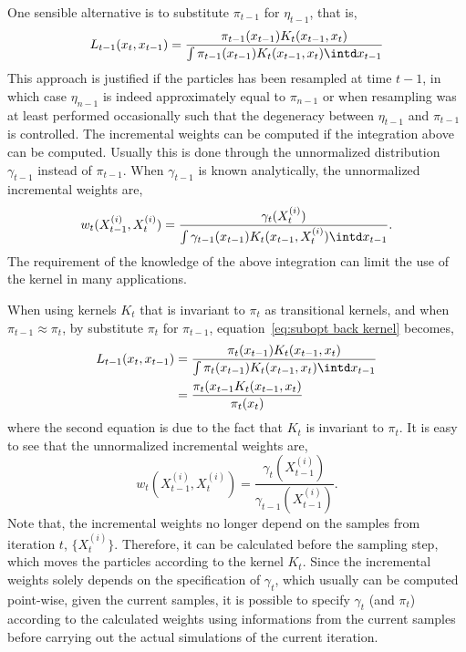 One sensible alternative is to substitute $\pi_{t-1}$ for $\eta_{t-1}$, that
is,
\begin{equation}
  L_{t-1}(x_t,x_{t-1}) =
  \frac{\pi_{t-1}(x_{t-1})K_t(x_{t-1},x_t)}
  {\int \pi_{t-1}(x_{t-1})K_t(x_{t-1},x_t)\intd x_{t-1}}
  \label{eq:subopt back kernel}
\end{equation}
This approach is justified if the particles has been resampled at time $t-1$,
in which case $\eta_{n-1}$ is indeed approximately equal to $\pi_{n-1}$ or
when resampling was at least performed occasionally such that the degeneracy
between $\eta_{t-1}$ and $\pi_{t-1}$ is controlled. The incremental weights
can be computed if the integration above can be computed.  Usually this is
done through the unnormalized distribution $\gamma_{t-1}$ instead of
$\pi_{t-1}$. When $\gamma_{t-1}$ is known analytically, the unnormalized
incremental weights are,
\begin{equation}
  w_t(X_{t-1}^{(i)},X_t^{(i)}) =
  \frac{\gamma_t(X_t^{(i)})}
  {\int\gamma_{t-1}(x_{t-1})K_t(x_{t-1},X_t^{(i)})\intd x_{t-1}}.
  \label{eq:inc weight subopt}
\end{equation}
The requirement of the knowledge of the above integration can limit the use of
the kernel in many applications.

When using \mcmc kernels $K_t$ that is invariant to $\pi_t$ as transitional
kernels, and when $\pi_{t-1}\approx\pi_t$, by substitute $\pi_t$ for
$\pi_{t-1}$, equation~\eqref{eq:subopt back kernel} becomes,
\begin{align}
  L_{t-1}(x_t,x_{t-1})
  &= \frac{\pi_t(x_{t-1})K_t(x_{t-1},x_t)}
  {\int \pi_t(x_{t-1})K_t(x_{t-1},x_t)\intd x_{t-1}} \notag\\
  &= \frac{\pi_t(x_{t-1}K_t(x_{t-1},x_t)}{\pi_t(x_t)}
  \label{eq:subopt back kernel mcmc}
\end{align}
where the second equation is due to the fact that $K_t$ is invariant to
$\pi_t$. It is easy to see that the unnormalized incremental weights are,
\begin{equation}
  w_t(X_{t-1}^{(i)},X_t^{(i)}) =
  \frac{\gamma_t(X_{t-1}^{(i)})}{\gamma_{t-1}(X_{t-1}^{(i)})}.
  \label{eq:inc weight subopt mcmc}
\end{equation}
Note that, the incremental weights no longer depend on the samples from
iteration $t$, $\{X_t^{(i)}\}$. Therefore, it can be calculated before the
sampling step, which moves the particles according to the kernel $K_t$. Since
the incremental weights solely depends on the specification of $\gamma_t$,
which usually can be computed point-wise, given the current samples, it is
possible to specify $\gamma_t$ (and $\pi_t$) according to the calculated
weights using informations from the current samples before carrying out the
actual simulations of the current iteration.

